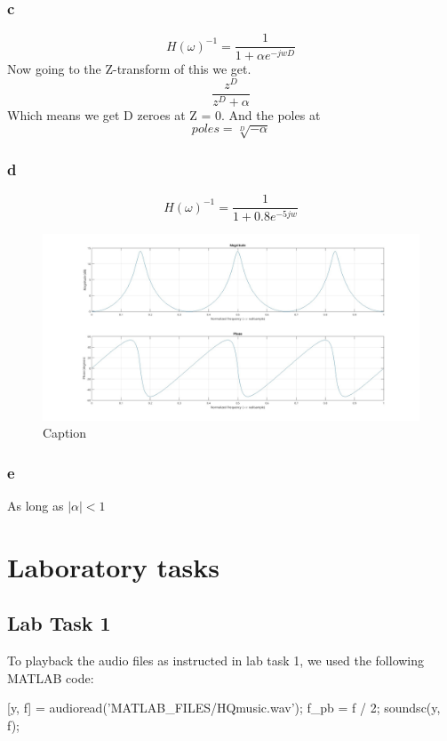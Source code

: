 \documentclass[a4paper,11pt]{article}
\begin{document}
\subsubsection{c}
\[
H(\omega)^{-1} = \frac{1}{1 + \alpha e^{-jwD}}
\]
Now going to the Z-transform of this we get.
\[
\frac{z^D}{z^D + \alpha}
\]
Which means we get D zeroes at Z = 0. And the poles at
\[
poles = \sqrt[D]{-\alpha}
\]
\subsubsection{d}
\[
H(\omega)^{-1} = \frac{1}{1 + 0.8 e^{-5jw}}
\]
\begin{figure}[H]
    \hspace{-45pt}\includegraphics[scale=0.28]{./images/prep-3d.jpg}
    \caption{Caption}
    \label{fig:my_label}
\end{figure}
\subsubsection{e}
As long as 
$
|\alpha| < 1
$

\section{Laboratory tasks}

\subsection{Lab Task 1}
To playback the audio files as instructed in lab task 1, we used the following MATLAB code:
\begin{ffcode} 
[y, f] = audioread('MATLAB_FILES/HQmusic.wav');
f_pb = f / 2;
soundsc(y, f);
\end{ffcode}
\end{document}
